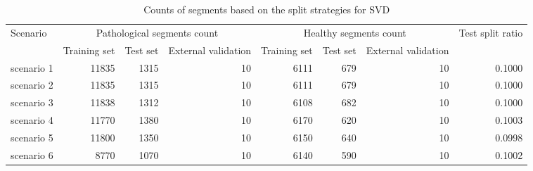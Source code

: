 \begin{table}
    \centering
    \begin{tabular}{lrrrrrrr}
        \toprule
        \multirow{2}{*}{Scenario} & \multicolumn{3}{c}{Pathological segments count} & \multicolumn{3}{c}{Healthy segments count} & \multirow{2}{*}{Test split ratio} \\
        & Training set & Test set & External validation & Training set & Test set & External validation & \\
        \midrule
            scenario 1 & 11835 & 1315 & 10 & 6111 & 679 & 10 & 0.1000 \\
			scenario 2 & 11835 & 1315 & 10 & 6111 & 679 & 10 & 0.1000 \\
			scenario 3 & 11838 & 1312 & 10 & 6108 & 682 & 10 & 0.1000 \\
			scenario 4 & 11770 & 1380 & 10 & 6170 & 620 & 10 & 0.1003 \\
			scenario 5 & 11800 & 1350 & 10 & 6150 & 640 & 10 & 0.0998 \\
			scenario 6 & 8770 & 1070 & 10 & 6140 & 590 & 10 & 0.1002 \\
        \bottomrule
    \end{tabular}
    \caption{Counts of segments based on the split strategies for SVD}
    \label{tab:svd_counts}
\end{table}